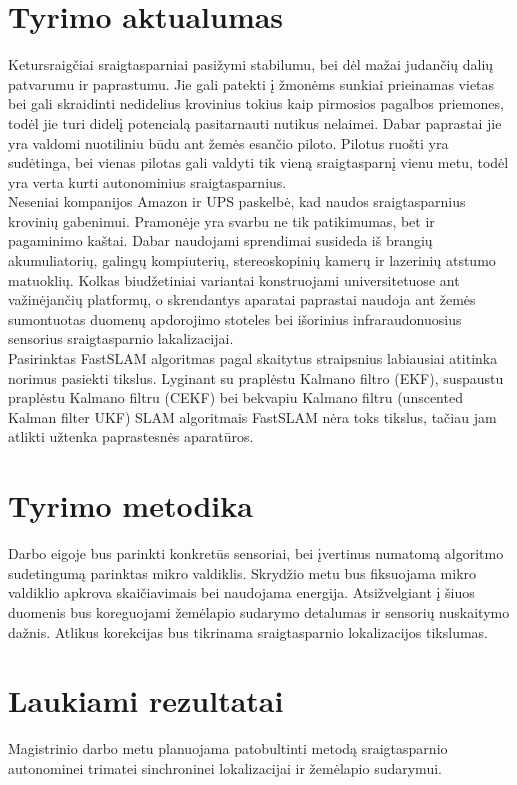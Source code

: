 \documentclass[a4paper, 12pt]{article} %
\begin{document}
\begin{onehalfspacing}
\section{Tyrimo aktualumas}
Ketursraig\v{c}iai sraigtasparniai pasi\v{z}ymi stabilumu, bei d\.el ma\v{z}ai
 judan\v{c}i\k{u} dali\k{u} patvarumu ir paprastumu. Jie gali patekti \k{i} \v{z}mon\.ems
  sunkiai prieinamas vietas bei gali skraidinti nedidelius krovinius tokius kaip pirmosios
   pagalbos priemones, tod\.el jie turi didel\k{i} potencial\k{a} pasitarnauti nutikus 
   nelaimei. Dabar paprastai jie yra valdomi nuotiliniu b\=udu ant \v{z}em\.es esan\v{c}io
    piloto. Pilotus ruo\v{s}ti yra sud\.etinga, bei vienas pilotas gali valdyti tik 
    vien\k{a} sraigtasparn\k{i} vienu metu, tod\.el yra verta kurti 
    autonominius sraigtasparnius.\\
    \indent Neseniai kompanijos Amazon ir UPS paskelb\.e, kad naudos sraigtasparnius krovini\k{u} gabenimui. Pramon\.eje yra svarbu ne tik patikimumas, bet ir pagaminimo ka\v{s}tai. Dabar naudojami sprendimai susideda i\v{s} brangi\k{u} akumuliatori\k{u}, galing\k{u} kompiuteri\k{u}, stereoskopini\k{u} kamer\k{u} ir lazerini\k{u} atstumo matuokli\k{u}\cite{Nguyen2007}. Kolkas biud\v{z}etiniai variantai konstruojami universitetuose ant va\v{z}in\.ejan\v{c}i\k{u} platform\k{u}\cite{Vincke2010a}\cite{Longchamp2010}, o skrendantys aparatai paprastai naudoja ant \v{z}em\.es sumontuotas duomen\k{u} apdorojimo stoteles bei i\v{s}orinius infraraudonuosius sensorius sraigtasparnio lakalizacijai.
    \\
    \indent Pasirinktas FastSLAM algoritmas pagal skaitytus straipsnius labiausiai atitinka norimus pasiekti tikslus. Lyginant su prapl\.estu Kalmano filtro (EKF), suspaustu prapl\.estu Kalmano filtru (CEKF) bei bekvapiu Kalmano filtru (unscented Kalman filter UKF)\cite{6389151} SLAM algoritmais FastSLAM n\.era toks tikslus, ta\v{c}iau jam atlikti u\v{z}tenka paprastesn\.es aparat\=uros\cite{Zikos2011}. 


\section{Tyrimo metodika}
Darbo eigoje bus parinkti konkret\=us sensoriai, bei \k{i}vertinus numatom\k{a} algoritmo sudetingum\k{a} parinktas mikro valdiklis. Skryd\v{z}io metu bus fiksuojama mikro valdiklio apkrova skai\v{c}iavimais bei naudojama energija. Atsi\v{z}velgiant \k{i} \v{s}iuos duomenis bus koreguojami \v{z}em\.elapio sudarymo detalumas ir sensori\k{u} nuskaitymo da\v{z}nis. Atlikus korekcijas bus tikrinama sraigtasparnio lokalizacijos tikslumas.

\section{Laukiami rezultatai}

Magistrinio darbo metu planuojama patobultinti metod\k{a} sraigtasparnio autonominei trimatei sinchroninei lokalizacijai ir \v{z}em\.elapio sudarymui. 


\end{onehalfspacing}
\end{document}
